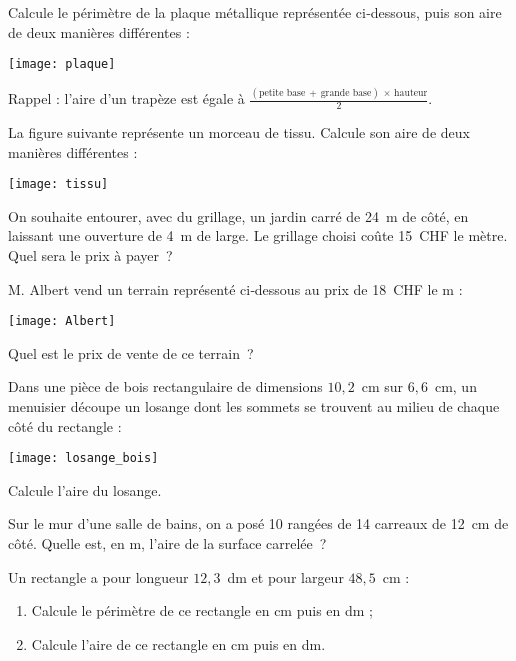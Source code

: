 \begin{exercice}
Calcule le périmètre de la plaque métallique représentée ci‑dessous, puis son aire de deux manières différentes :
\begin{center} \texttt{[image: plaque]} \end{center}

Rappel : l'aire d'un trapèze est égale à $\frac{{(\text{petite base}\, +\, \text{grande base})} \, \times \, {\text{hauteur}}}{2}$.
\end{exercice}


\begin{exercice}
La figure suivante représente un morceau de tissu. Calcule son aire de deux manières différentes :
\begin{center} \texttt{[image: tissu]} \end{center}
\end{exercice}


\begin{exercice}
On souhaite entourer, avec du grillage, un jardin carré de 24 m de côté, en laissant une ouverture de 4 m de large. Le grillage choisi coûte 15 CHF le mètre. Quel sera le prix à payer ?
\end{exercice}


\begin{exercice}
M. Albert vend un terrain représenté ci‑dessous au prix de 18 CHF le m :
\begin{center} \texttt{[image: Albert]} \end{center}
Quel est le prix de vente de ce terrain ?
\end{exercice}


\begin{exercice}
Dans une pièce de bois rectangulaire de dimensions $10,2$ cm sur $6,6$ cm, un menuisier découpe un losange dont les sommets se trouvent au milieu de chaque côté du rectangle :
\begin{center} \texttt{[image: losange\_bois]} \end{center}
Calcule l'aire du losange.
\end{exercice}


\begin{exercice}
Sur le mur d’une salle de bains, on a posé 10 rangées de 14 carreaux de 12 cm de côté. Quelle est, en m, l’aire de la surface carrelée ?
\end{exercice}


\begin{exercice}
Un rectangle a pour longueur $12,3$ dm et pour largeur $48,5$ cm :
\begin{enumerate}
 \item Calcule le périmètre de ce rectangle en cm puis en dm ;
 \item Calcule l'aire de ce rectangle en cm puis en dm.
 \end{enumerate}
\end{exercice}


